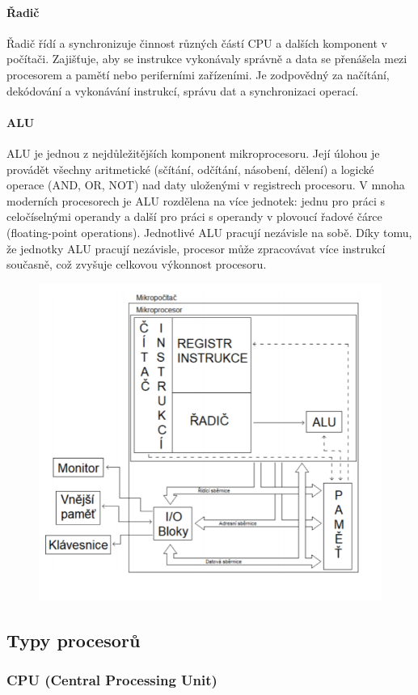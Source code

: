 \paragraph{Řadič}
Řadič řídí a synchronizuje činnost různých částí CPU a dalších komponent v počítači. Zajišťuje, aby se instrukce vykonávaly správně a data se přenášela mezi procesorem a pamětí nebo periferními zařízeními.  Je zodpovědný za načítání, dekódování a vykonávání instrukcí, správu dat a synchronizaci operací.

\paragraph{ALU}
ALU je jednou z nejdůležitějších komponent mikroprocesoru. Její úlohou je provádět všechny aritmetické (sčítání, odčítání, násobení, dělení) a logické operace (AND, OR, NOT) nad daty uloženými v registrech procesoru. V mnoha moderních procesorech je ALU rozdělena na více jednotek: jednu pro práci s celočíselnými operandy a další pro práci s operandy v plovoucí řadové čárce (floating-point operations). Jednotlivé ALU pracují nezávisle na sobě. Díky tomu, že jednotky ALU pracují nezávisle, procesor může zpracovávat více instrukcí současně, což zvyšuje celkovou výkonnost procesoru.

\begin{figure}[h]
    \centering
    \includegraphics[width=0.5\linewidth]{sections/2_mikroprocesor/images/Screenshot 2024-08-22 133255.png}

\end{figure}

\subsection{Typy procesorů}

\subsubsection{CPU (Central Processing Unit)}
